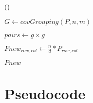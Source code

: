 \documentclass[11pt]{article}
\begin{document}
\begin{algorithm}

 \Begin() {
	$G\leftarrow covGrouping(P,n,m)$
	
	 {
		$pairs\leftarrow g \times g$
		
		 {
			$Pnew_{row,col}\leftarrow \frac{n}{d} * P_{row,col}$
		}
	}
	\Return $Pnew$
}	
\end{algorithm}

\clearpage
\appendix
\section{Pseudocode}


\end{document}
